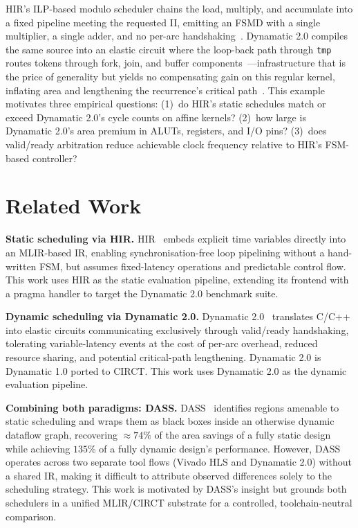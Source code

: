 \documentclass[sigplan,10pt,review,nonacm]{acmart}
\begin{document}
HIR's ILP-based modulo scheduler chains the load, multiply, and
accumulate into a fixed pipeline meeting the requested II, emitting an
FSMD with a single multiplier, a single adder, and no per-arc
handshaking~\cite{10.1145/3623278.3624767}. Dynamatic 2.0 compiles the same
source into an elastic circuit where the loop-back path through
\texttt{tmp} routes tokens through fork, join, and buffer
components~\cite{10.1145/3373087.3375391}---infrastructure that is
the price of generality but yields no compensating gain on this regular
kernel, inflating area and lengthening the recurrence's critical
path~\cite{9378784}. This example motivates three empirical questions:
(1)~do HIR's static schedules match or exceed Dynamatic 2.0's cycle counts
on affine kernels? (2)~how large is Dynamatic 2.0's area premium in ALUTs,
registers, and I/O pins? (3)~does valid/ready arbitration reduce
achievable clock frequency relative to HIR's FSM-based controller?

\section{Related Work}

\textbf{Static scheduling via HIR.}
HIR~\cite{10.1145/3623278.3624767} embeds explicit time variables
directly into an MLIR-based IR, enabling synchronisation-free loop
pipelining without a hand-written FSM, but assumes fixed-latency
operations and predictable control flow. This work uses HIR as the
static evaluation pipeline, extending its frontend with a pragma handler
to target the Dynamatic 2.0 benchmark suite.

\textbf{Dynamic scheduling via Dynamatic 2.0.}
Dynamatic 2.0~\cite{10.1145/3373087.3375391} translates C/C++ into elastic
circuits communicating exclusively through valid/ready handshaking,
tolerating variable-latency events at the cost of per-arc overhead,
reduced resource sharing, and potential critical-path lengthening.
Dynamatic 2.0 is Dynamatic 1.0 ported to CIRCT. This
work uses Dynamatic 2.0 as the dynamic evaluation pipeline.

\textbf{Combining both paradigms: DASS.}
DASS~\cite{9378784} identifies regions amenable to static scheduling and
wraps them as black boxes inside an otherwise dynamic dataflow graph,
recovering ${\approx}74\%$ of the area savings of a fully static design
while achieving $135\%$ of a fully dynamic design's performance.
However, DASS operates across two separate tool flows (Vivado HLS and
Dynamatic 2.0) without a shared IR, making it difficult to attribute
observed differences solely to the scheduling strategy. This work is
motivated by DASS's insight but grounds both schedulers in a unified
MLIR/CIRCT substrate for a controlled, toolchain-neutral comparison.
\end{document}
